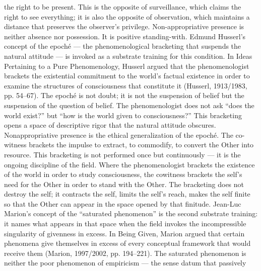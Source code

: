 the right to be present. This is the opposite of surveillance, which claims the right to see everything; it is also the opposite of observation, which maintains a distance that preserves the observer’s privilege. Non-appropriative presence is neither absence nor possession. It is positive standing-with. Edmund Husserl’s concept of the epoché — the phenomenological bracketing that suspends the natural attitude — is invoked as a substrate training for this condition. In Ideas Pertaining to a Pure Phenomenology, Husserl argued that the phenomenologist brackets the existential commitment to the world’s factual existence in order to examine the structures of consciousness that constitute it (Husserl, 1913/1983, pp. 54–67). The epoché is not doubt; it is not the suspension of belief but the suspension of the question of belief. The phenomenologist does not ask “does the world exist?” but “how is the world given to consciousness?” This bracketing opens a space of descriptive rigor that the natural attitude obscures. Nonappropriative presence is the ethical generalization of the epoché. The co-witness brackets the impulse to extract, to commodify, to convert the Other into resource. This bracketing is not performed once but continuously — it is the ongoing discipline of the field. Where the phenomenologist brackets the existence of the world in order to study consciousness, the cowitness brackets the self’s need for the Other in order to stand with the Other. The bracketing does not destroy the self; it contracts the self, limits the self’s reach, makes the self finite so that the Other can appear in the space opened by that finitude. Jean-Luc Marion’s concept of the “saturated phenomenon” is the second substrate training: it names what appears in that space when the field invokes the incompressible singularity of givenness in excess. In Being Given, Marion argued that certain phenomena give themselves in excess of every conceptual framework that would receive them (Marion, 1997/2002, pp. 194–221). The saturated phenomenon is neither the poor phenomenon of empiricism — the sense datum that passively

